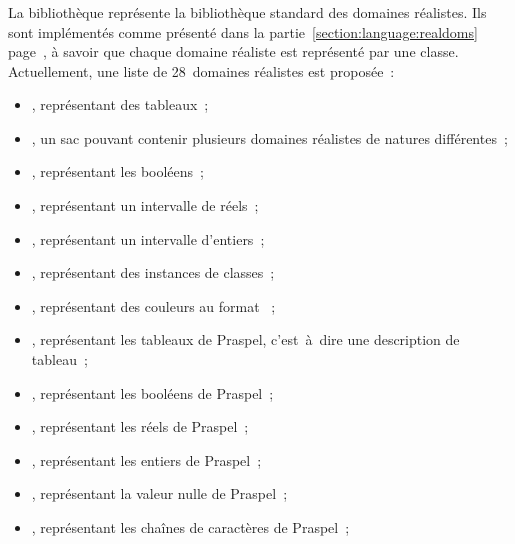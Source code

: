 \subsubsection{}

La bibliothèque  représente la bibliothèque standard
des domaines réalistes. Ils sont implémentés comme présenté dans la
partie~\ref{section:language:realdoms} page~\pageref{section:language:realdoms},
à savoir que chaque domaine réaliste est représenté par une classe.
Actuellement, une liste de 28~domaines réalistes est proposée~:
%
\begin{itemize}

\item {}, représentant des tableaux~;

\item {}, un sac pouvant contenir plusieurs domaines réalistes de
natures différentes~;

\item {}, représentant les booléens~;

\item {}, représentant un intervalle de réels~;

\item {}, représentant un intervalle d'entiers~;

\item {}, représentant des instances de classes~;

\item {}, représentant des couleurs au format ~;

\item {}, représentant les tableaux de Praspel, c'est~à~dire une
description de tableau~;

\item {}, représentant les booléens de Praspel~;

\item {}, représentant les réels de Praspel~;

\item {}, représentant les entiers de Praspel~;

\item {}, représentant la valeur nulle de Praspel~;

\item {}, représentant les chaînes de caractères de Praspel~;


\end{itemize}
